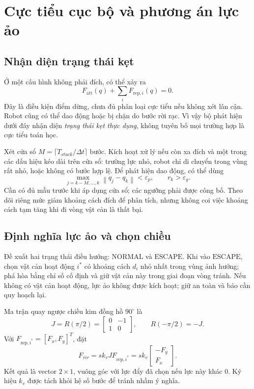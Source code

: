 \documentclass[12pt,a4paper,oneside]{report}
\numberwithin{equation}{chapter}
\newcommand{\norm}[1]{\left\lVert #1\right\rVert}
\newcommand{\att}{\mathrm{att}}
\newcommand{\rep}{\mathrm{rep}}
\begin{document}
\section{Cực tiểu cục bộ và phương án lực ảo}

\subsection{Nhận diện trạng thái kẹt}

Ở một cấu hình không phải đích, có thể xảy ra
\begin{equation}
F_{\att}(q)+\sum_iF_{\rep,i}(q)=0.
\end{equation}
Đây là điều kiện điểm dừng, chưa đủ phân loại cực tiểu nếu không xét lân cận. Robot cũng có thể dao động hoặc bị chặn do bước rời rạc. Vì vậy bộ phát hiện dưới đây nhận diện \emph{trạng thái kẹt thực dụng}, không tuyên bố mọi trường hợp là cực tiểu toán học.

Xét cửa sổ $M=\lceil T_{stuck}/\Delta t\rceil$ bước. Kích hoạt xử lý nếu còn xa đích và một trong các dấu hiệu kéo dài trên cửa sổ: trường lực nhỏ, robot chỉ di chuyển trong vùng rất nhỏ, hoặc không có bước hợp lệ. Để phát hiện dao động, có thể dùng
\begin{equation}
\max_{j=k-M,\ldots,k}\norm{q_j-q_k}<\varepsilon_p,
\qquad r_k>\varepsilon_g.
\end{equation}
Cần có đủ mẫu trước khi áp dụng cửa sổ; các ngưỡng phải được công bố. Theo dõi riêng mức giảm khoảng cách đích để phân tích, nhưng không coi việc khoảng cách tạm tăng khi đi vòng vật cản là thất bại.

\subsection{Định nghĩa lực ảo và chọn chiều}

Đề xuất hai trạng thái điều hướng: $\mathrm{NORMAL}$ và $\mathrm{ESCAPE}$. Khi vào $\mathrm{ESCAPE}$, chọn vật cản hoạt động $i^*$ có khoảng cách $d_i$ nhỏ nhất trong vùng ảnh hưởng; phá hòa bằng chỉ số cố định và giữ vật cản này trong giai đoạn vòng tránh. Nếu không có vật cản hoạt động, lực ảo không được kích hoạt; giữ an toàn và báo cần quy hoạch lại.

Ma trận quay ngược chiều kim đồng hồ $90^\circ$ là
\begin{equation}
J=R(\pi/2)=\begin{bmatrix}0&-1\\1&0\end{bmatrix},\qquad R(-\pi/2)=-J.
\end{equation}
Với $F_{\rep,i^*}=[F_x,F_y]^T$, đặt
\begin{equation}
F_{vir}=s k_v JF_{\rep,i^*}
=s k_v\begin{bmatrix}-F_y\\F_x\end{bmatrix}.
\label{eq:virtual}
\end{equation}
Kết quả là vector $2\times1$, vuông góc với lực đẩy đã chọn nếu lực này khác 0. Ký hiệu $k_v$ được tách khỏi hệ số bước để tránh nhầm ý nghĩa.
\end{document}
